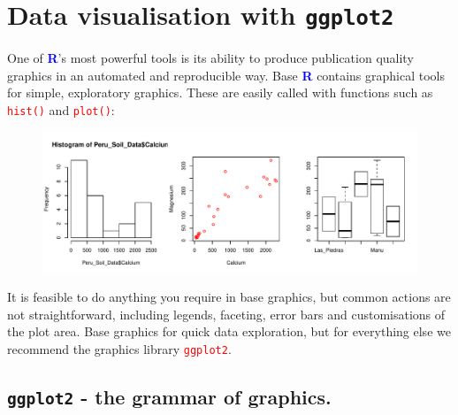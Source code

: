 \documentclass[a4paper,12pt]{article}
\newcommand\boldblue[1]{\textcolor{blue}{\textbf{#1}}}
\newcommand\code[1]{\textcolor{red}{\texttt{#1}}}
\begin{document}
\section{Data visualisation with \texttt{ggplot2}}

One of \boldblue{R}'s most powerful tools is its ability to produce publication quality graphics in an automated and reproducible way. Base \boldblue{R} contains graphical tools for simple, exploratory graphics. These are easily called with functions such as \code{hist()} and \code{plot()}:



\begin{shaded}
\begin{Schunk}
\end{Schunk}
\end{shaded}


\begin{figure}[h]
	\centering 
	\includegraphics[width=1\textwidth]{figs/base_graphs.pdf}
	\label{fig:Base_graphs}
\end{figure} 



It is feasible to do anything you require in base graphics, but common actions are not straightforward, including legends, faceting, error bars and customisations of the plot area. Base graphics for quick data exploration, but for everything else we recommend the graphics library \code{ggplot2}.

\subsection{\texttt{ggplot2} - the grammar of graphics.}
\end{document}
